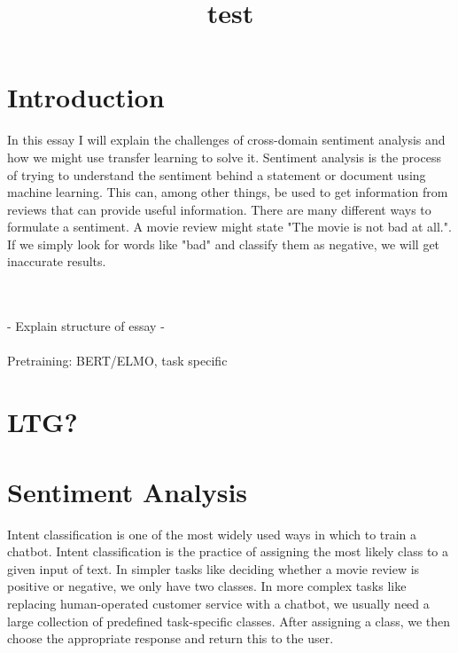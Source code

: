 \documentclass{report}
\begin{document}
\title{test}
\duoforside[author={Adrian Eriksen}, dept={Department of Informatics}, program={Language Technology}]

\setcounter{secnumdepth}{0}

\section{Introduction}
In this essay I will explain the challenges of cross-domain sentiment analysis and how we might use transfer learning to solve it.
Sentiment analysis is the process of trying to understand the sentiment behind a statement or document using machine learning. This can, among other things, be used to get information from reviews that can provide useful information.
There are many different ways to formulate a sentiment. A movie review might state "The movie is not bad at all.". If we simply look for words like "bad" and classify them as negative, we will get inaccurate results.


\\\\  - Explain structure of essay - \\\\
Pretraining: BERT/ELMO, task specific\\



\newpage

\section{LTG?}

\newpage
\section{Sentiment Analysis}
Intent classification is one of the most widely used ways in which to train a chatbot. Intent classification is the practice of assigning the most likely class to a given input of text. In simpler tasks like deciding whether a movie review is positive or negative, we only have two classes. In more complex tasks like replacing human-operated customer service with a chatbot, we usually need a large collection of predefined task-specific classes. 
\noindent
After assigning a class, we then choose the appropriate response and return this to the user. \\\\ 
\end{document}
